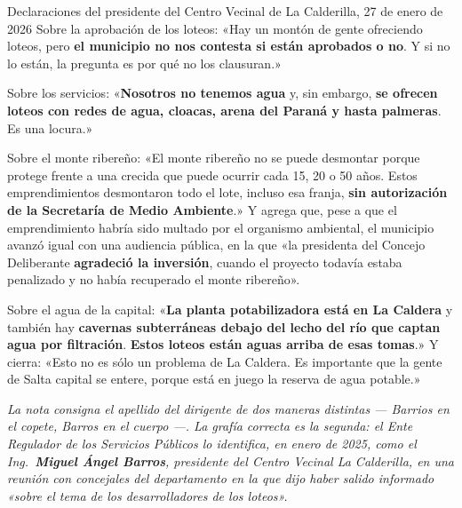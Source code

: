 \begin{ficha}{Declaraciones del presidente del Centro Vecinal de La Calderilla, 27 de enero de 2026}
Sobre la aprobación de los loteos: «Hay un montón de gente ofreciendo loteos, pero
\textbf{el municipio no nos contesta si están aprobados o no}. Y si no lo están, la pregunta
es por qué no los clausuran.»

Sobre los servicios: «\textbf{Nosotros no tenemos agua} y, sin embargo, \textbf{se ofrecen
loteos con redes de agua, cloacas, arena del Paraná y hasta palmeras}. Es una locura.»

Sobre el monte ribereño: «El monte ribereño no se puede desmontar porque protege frente a
una crecida que puede ocurrir cada 15, 20 o 50 años. Estos emprendimientos desmontaron todo
el lote, incluso esa franja, \textbf{sin autorización de la Secretaría de Medio Ambiente}.»
Y agrega que, pese a que el emprendimiento habría sido multado por el organismo ambiental,
el municipio avanzó igual con una audiencia pública, en la que «la presidenta del Concejo
Deliberante \textbf{agradeció la inversión}, cuando el proyecto todavía estaba penalizado y
no había recuperado el monte ribereño».

Sobre el agua de la capital: «\textbf{La planta potabilizadora está en La Caldera} y también
hay \textbf{cavernas subterráneas debajo del lecho del río que captan agua por filtración}.
\textbf{Estos loteos están aguas arriba de esas tomas}.» Y cierra: «Esto no es sólo un
problema de La Caldera. Es importante que la gente de Salta capital se entere, porque está
en juego la reserva de agua potable.»

\textit{La nota consigna el apellido del dirigente de dos maneras distintas --- Barrios en el
copete, Barros en el cuerpo ---. La grafía correcta es la segunda: el Ente Regulador de los
Servicios Públicos lo identifica, en enero de 2025, como el Ing.\ \textbf{Miguel Ángel Barros},
presidente del Centro Vecinal La Calderilla, en una reunión con concejales del departamento en
la que dijo haber salido informado «sobre el tema de los desarrolladores de los loteos».}
\end{ficha}

